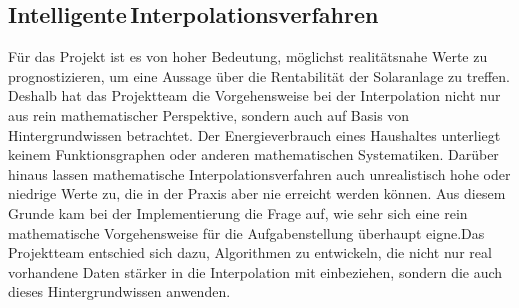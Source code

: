 

\subsection{\glqq Intelligente\grqq \,Interpolationsverfahren}
Für das Projekt ist es von hoher Bedeutung, möglichst realitätsnahe Werte zu prognostizieren, um eine Aussage über die Rentabilität der Solaranlage zu treffen. Deshalb hat das Projektteam die Vorgehensweise bei der Interpolation nicht nur aus rein mathematischer Perspektive, sondern auch auf Basis von Hintergrundwissen betrachtet. Der Energieverbrauch eines Haushaltes unterliegt keinem Funktionsgraphen oder anderen mathematischen Systematiken. Darüber hinaus lassen mathematische Interpolationsverfahren auch unrealistisch hohe oder niedrige Werte zu, die in der Praxis aber nie erreicht werden können. Aus diesem Grunde kam bei der Implementierung die Frage auf, wie sehr sich eine rein mathematische Vorgehensweise für die Aufgabenstellung überhaupt eigne.Das Projektteam entschied sich dazu, Algorithmen zu entwickeln, die nicht nur real vorhandene Daten stärker in die Interpolation mit einbeziehen, sondern die auch dieses Hintergrundwissen anwenden.

